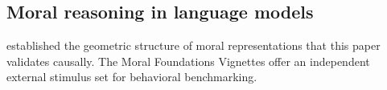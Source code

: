 \subsection{Moral reasoning in language models}\label{moral-reasoning-in-language-models}

\citet{reblitzrichardson2026geometry} established the geometric structure of moral representations that this paper validates causally.
The Moral Foundations Vignettes \citep{clifford2015moral} offer an independent external stimulus set for behavioral benchmarking.
